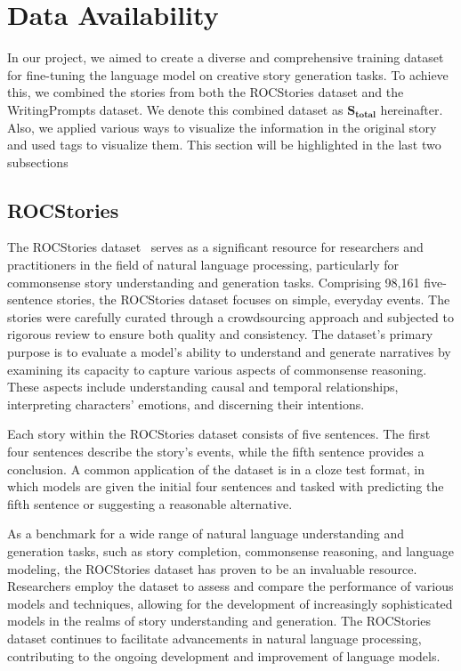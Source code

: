 \documentclass{article} %
\begin{document}

\section{Data Availability}
In our project, we aimed to create a diverse and comprehensive training dataset for fine-tuning the language model on creative story generation tasks. To achieve this, we combined the stories from both the ROCStories dataset and the WritingPrompts dataset. We denote this combined dataset as $\mathbf{S_{total}}$ hereinafter. Also, we applied various ways to visualize the information in the original story and used tags to visualize them. This section will be highlighted in the last two subsections
\subsection{ROCStories}
The ROCStories dataset~\cite{mostafazadeh2016corpus} serves as a significant resource for researchers and practitioners in the field of natural language processing, particularly for commonsense story understanding and generation tasks. Comprising 98,161 five-sentence stories, the ROCStories dataset focuses on simple, everyday events. The stories were carefully curated through a crowdsourcing approach and subjected to rigorous review to ensure both quality and consistency. The dataset's primary purpose is to evaluate a model's ability to understand and generate narratives by examining its capacity to capture various aspects of commonsense reasoning. These aspects include understanding causal and temporal relationships, interpreting characters' emotions, and discerning their intentions.

Each story within the ROCStories dataset consists of five sentences. The first four sentences describe the story's events, while the fifth sentence provides a conclusion. A common application of the dataset is in a cloze test format, in which models are given the initial four sentences and tasked with predicting the fifth sentence or suggesting a reasonable alternative.

As a benchmark for a wide range of natural language understanding and generation tasks, such as story completion, commonsense reasoning, and language modeling, the ROCStories dataset has proven to be an invaluable resource. Researchers employ the dataset to assess and compare the performance of various models and techniques, allowing for the development of increasingly sophisticated models in the realms of story understanding and generation. The ROCStories dataset continues to facilitate advancements in natural language processing, contributing to the ongoing development and improvement of language models.
\end{document}
